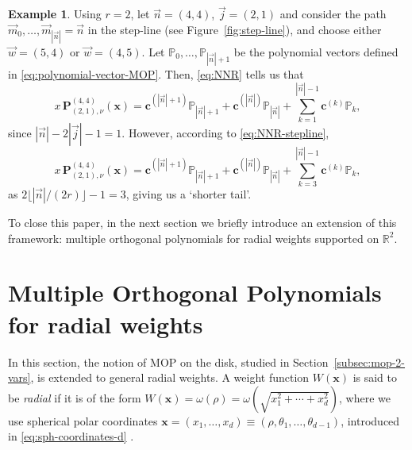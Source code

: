 \documentclass[a4paper]{article}
\theoremstyle{plain}
\theoremstyle{definition}
\newtheorem{example}[theorem]{Example}
\begin{document}
    \begin{example}
        Using $r=2$, let $\vec n = (4,4)$, $\vec j =(2,1)$ and consider the path $\vec m_0,\dots,\vec m_{|\vec n|}=\vec n$ in the step-line (see Figure~\ref{fig:step-line}), and choose either $\vec w=(5,4)$ or $\vec w=(4,5)$. Let $\mathbb P_0,\dots,\mathbb P_{|\vec n|+1}$ be the polynomial vectors defined in \eqref{eq:polynomial-vector-MOP}. Then, \eqref{eq:NNR} tells us that
        \begin{equation*}
            x\, \mathbf P_{(2,1),\nu}^{(4,4)}(\mathbf x) = \mathbf c^{(|\vec n|+1)}\mathbb P_{|\vec n|+1} + \mathbf c^{(|\vec n|)}\mathbb P_{|\vec n|} +  \sum_{k=1}^{|\vec n|-1}\mathbf c^{(k)}\mathbb P_{k},
        \end{equation*}
        since $|\vec n|-2|\vec j|-1 = 1$. However, according to \eqref{eq:NNR-stepline},
        \begin{equation*}
            x\, \mathbf P_{(2,1),\nu}^{(4,4)}(\mathbf x) = \mathbf c^{(|\vec n|+1)}\mathbb P_{|\vec n|+1} + \mathbf c^{(|\vec n|)}\mathbb P_{|\vec n|} +  \sum_{k=3}^{|\vec n|-1}\mathbf c^{(k)}\mathbb P_{k},
        \end{equation*}
        as $2\lfloor|\vec n|/(2r)\rfloor-1 =3$, giving us a `shorter tail'.
    \end{example}

    To close this paper, in the next section we briefly introduce an extension of this framework: multiple orthogonal polynomials for radial weights supported on $\mathbb R^2$.
    
    \section{Multiple Orthogonal Polynomials for radial weights}\label{sec:radial-weights}

    In this section, the notion of MOP on the disk, studied in Section~\ref{subsec:mop-2-vars}, is extended to general radial weights. A weight function $W(\mathbf x)$ is said to be \emph{radial} if it is of the form $W(\mathbf x)=\omega(\rho)=\omega(\sqrt{x_1^2+\cdots + x_d^2})$, where we use spherical polar coordinates $\mathbf x =(x_1,\dots,x_d)\equiv(\rho,\theta_1,\dots,\theta_{d-1})$, introduced in \eqref{eq:sph-coordinates-d} \cite[Sections 2.6.2 and 5.1.2]{DX14}. 
       
\end{document}
